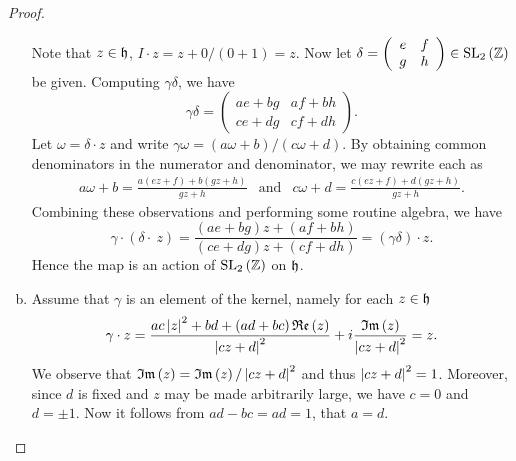 \documentclass[10pt]{amsart}
\begin{document}
\begin{thm}
\begin{proof}
\begin{enumerate}[(a)]
	Note that $z \in \mathfrak{h}$, $I\cdot z = z + 0 / (0 + 1) = z$.
	Now let $\delta = \left(\begin{array}{cc} e & f\\g & h\end{array}\right) \in \operatorname{SL}_2\left(\mathbb{Z}\right)$ be given.			
	  Computing $\gamma\delta$, we have $$\gamma\delta = \left(\begin{array}{cc} ae + bg & af + bh\\ce + dg & cf + dh\end{array}\right).$$
	    Let $\omega = \delta\cdot z$ and write $\gamma\omega = (a\omega + b)/(c\omega + d)$.
	    By obtaining common denominators in the numerator and denominator, we may rewrite each as
	    $$\begin{array}{lcr}
	      a\omega + b = \displaystyle{\frac{a(ez + f) + b(gz+h)}{gz+h}} &\text{and}& c\omega + d = \displaystyle{\frac{c(ez + f) + d(gz+h)}{gz+h}}.
	    \end{array}$$
	    Combining these observations and performing some routine algebra, we have $$\gamma\cdot(\delta\cdot\ z) = \frac{(ae + bg)z + (af + bh)}{(ce + dg)z + (cf + dh)} = (\gamma\delta)\cdot z.$$
	    Hence the map is an action of $\operatorname{SL}_2\left(\mathbb{Z}\right)$ on $\mathfrak{h}$.
	  \item
	    Assume that $\gamma$ is an element of the kernel, namely for each $z \in \mathfrak{h}$
	    \begin{equation}\label{kernel}
	      \gamma\cdot z = \frac{ac\left| z \right|^2 + bd + (ad + bc)\operatorname{\mathfrak{Re}}\left(z\right)}{\left| cz+d \right|^2} + i\frac{\operatorname{\mathfrak{Im}}\left(z\right)}{\left| cz+d \right|^2} = z.
	    \end{equation}
	    We observe that $\operatorname{\mathfrak{Im}}\left(z\right) = \operatorname{\mathfrak{Im}}\left(z\right)/\left| cz + d \right|^2$ and thus $\left| cz + d \right|^2 = 1$.
	    Moreover, since $d$ is fixed and $z$ may be made arbitrarily large, we have $c = 0$ and $d = \pm1$.
	    Now it follows from $ad - bc = ad = 1$, that $a = d$.
	    

\end{enumerate}
\end{proof}
\end{thm}
\end{document}
